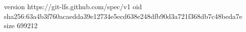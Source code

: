 version https://git-lfs.github.com/spec/v1
oid sha256:63a4b3f760acaedda39e12734e5ecd638e248dfb90d3a721f368db7c48beda7e
size 699212
